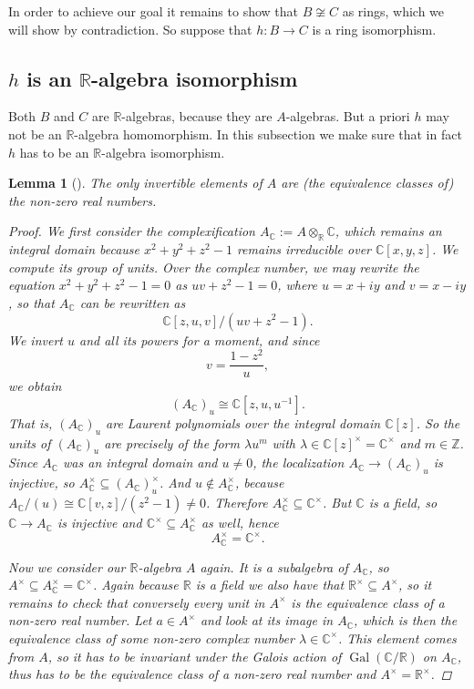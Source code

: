 \documentclass[A4paper, 12pt, british, reqno]{amsart}
\newcommand{\C}{\mathbb{C}} %
\newcommand{\R}{\mathbb{R}} %
\newcommand{\Z}{\mathbb{Z}} %
\theoremstyle{plain}
\newtheorem{lm}[thm]{Lemma}
\theoremstyle{definition}
\theoremstyle{remark}
\theoremstyle{plain}
\theoremstyle{definition}
\theoremstyle{remark}
\theoremstyle{plain}
\theoremstyle{definition}
\theoremstyle{remark}
\newcommand{\ot}{\otimes}
\begin{document}
In order to achieve our goal it remains to show that $B\not\cong C$ as rings, which we will show by contradiction.
So suppose that $h\colon B\to C$ is a ring isomorphism.

\subsection{$h$ is an $\R$-algebra isomorphism}
Both $B$ and $C$ are $\R$-algebras, because they are $A$-algebras.
But a priori $h$ may not be an $\R$-algebra homomorphism.
In this subsection we make sure that in fact $h$ has to be an $\R$-algebra isomorphism.

\begin{lm}[{\cite[Lemma 9.1]{swa87}}]\label{lm:units}
    The only invertible elements of $A$ are (the equivalence classes of) the non-zero real numbers.
    \begin{proof}
	We first consider the complexification $A_{\C}:=A\ot_{\R}\C$, which remains an integral domain because $x^{2}+y^{2}+z^{2}-1$ remains irreducible over $\C[x,y,z]$.
	We compute its group of units.
	Over the complex number, we may rewrite the equation $x^{2}+y^{2}+z^{2}-1=0$ as $uv+z^{2}-1=0$, where $u=x+iy$ and $v=x-iy$, so that $A_{\C}$ can be rewritten as
	\[ \C[z,u,v]/(uv+z^{2}-1). \]
	We invert $u$ and all its powers for a moment, and since
	\[ v=\frac{1-z^{2}}{u}, \]
	we obtain
	\[ (A_{\C})_{u}\cong \C[z,u,u^{-1}]. \]
	That is, $(A_{\C})_{u}$ are Laurent polynomials over the integral domain $\C[z]$.
	So the units of $(A_{\C})_{u}$ are precisely of the form $\lambda u^{m}$ with $\lambda\in \C[z]^{\times}=\C^{\times}$ and $m\in \Z$.
	Since $A_{\C}$ was an integral domain and $u\neq 0$, the localization $A_{\C}\to (A_{\C})_{u}$ is injective, so $A_{\C}^{\times}\subseteq (A_{\C})_{u}^{\times}$.
	And $u\not\in A_{\C}^{\times}$, because $A_{\C}/(u)\cong \C[v,z]/(z^{2}-1)\neq 0$.
	Therefore $A_{\C}^{\times}\subseteq \C^{\times}$.
	But $\C$ is a field, so $\C\to A_{\C}$ is injective and $\C^{\times}\subseteq A_{\C}^{\times}$ as well, hence
	\[ A_{\C}^{\times}=\C^{\times}. \]

	Now we consider our $\R$-algebra $A$ again.
	It is a subalgebra of $A_{\C}$, so $A^{\times}\subseteq A_{\C}^{\times}=\C^{\times}$.
	Again because $\R$ is a field we also have that $\R^{\times}\subseteq A^{\times}$, so it remains to check that conversely every unit in $A^{\times}$ is the equivalence class of a non-zero real number.
	Let $a\in A^{\times}$ and look at its image in $A_{\C}$, which is then the equivalence class of some non-zero complex number $\lambda\in \C^{\times}$.
	This element comes from $A$, so it has to be invariant under the Galois action of $\operatorname{Gal}(\C/\R)$ on $A_{\C}$, thus has to be the equivalence class of a non-zero real number and $A^{\times}=\R^{\times}$.
    \end{proof}
\end{lm}
\end{document}
